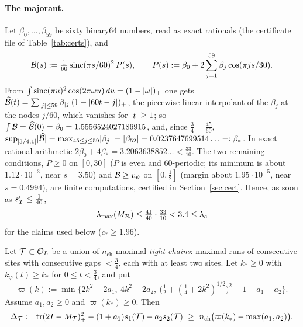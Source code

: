 \paragraph{The majorant.} Let $\beta_0,\dots,\beta_{59}$ be sixty binary64 numbers, read as exact rationals (the certificate file of
Table~\ref{tab:certs}), and
\[
\mathcal B(s):=\tfrac1{60}\operatorname{sinc}(\pi s/60)^2\,P(s),\qquad P(s):=\beta_0+2\sum_{j=1}^{59}\beta_j\cos(\pi js/30).
\]
From $\int\operatorname{sinc}(\pi u)^2\cos(2\pi\omega u)\,du=(1-\lvert \omega\rvert)_+$ one gets $\widehat{\mathcal B}(t)=\sum_{\lvert j\rvert\le59}\beta_{\lvert j\rvert}(1-\lvert 60t-j\rvert)_+$, the
piecewise-linear interpolant of the $\beta_j$ at the nodes $j/60$, which vanishes for $\lvert t\rvert\ge1$; so $\int\mathcal B=\widehat{\mathcal B}(0)=\beta_0=1.5556524027186915$,
and, since $\frac34=\frac{45}{60}$, $\sup_{[3/4,1]}\lvert \widehat{\mathcal B}\rvert=\max_{45\le j\le59}\lvert \beta_j\rvert=\lvert \beta_{52}\rvert=0.0237647699514\ldots=:\beta_*$. In
exact rational arithmetic $2\beta_0+4\beta_*=3.2063638852\ldots<\frac{33}{10}$. The two remaining conditions, $P\ge0$ on $[0,30]$ ($P$ is even and
$60$-periodic; its minimum is about $1.12\cdot10^{-3}$, near $s=3.50$) and $\mathcal B\ge v_\psi$ on $[0,\frac12]$ (margin about $1.95\cdot10^{-5}$, near
$s=0.4994$), are finite computations, certified in Section~\ref{sec:cert}. Hence, as soon as $\varepsilon'_T\le\frac1{40}$,
\begin{equation}\label{eq:room}
\lambda_{\max}(M_\mathcal R)\le\tfrac{41}{40}\cdot\tfrac{33}{10}<3.4\le\lambda_c
\end{equation}
for the claims used below ($c_*\ge1.96$).

\begin{lemma}\label{lem:tight}
Let $\mathcal T\subset\mathcal O_L$ be a union of $n_{\mathrm{ch}}$ maximal \emph{tight chains}: maximal runs of consecutive sites with consecutive gaps
$<\frac34$, each with at least two sites. Let $k_*\ge0$ with $k_\varphi(t)\ge k_*$ for $0\le t<\frac34$, and put
\[
\varpi(k):=\min\Big\{2k^2-2a_1,\ 4k^2-2a_2,\ \big(\tfrac12+(\tfrac14+2k^2)^{1/2}\big)^2-1-a_1-a_2\Big\}.
\]
Assume $a_1,a_2\ge0$ and $\varpi(k_*)\ge0$. Then
\[
\Delta_\cT:=\tr(2I-M_\cT)_+^2-(1+a_1)s_1(\cT)-a_2s_2(\cT)\ \ge\ n_{\mathrm{ch}}\big(\varpi(k_*)-\max(a_1,a_2)\big).
\]
\end{lemma}

